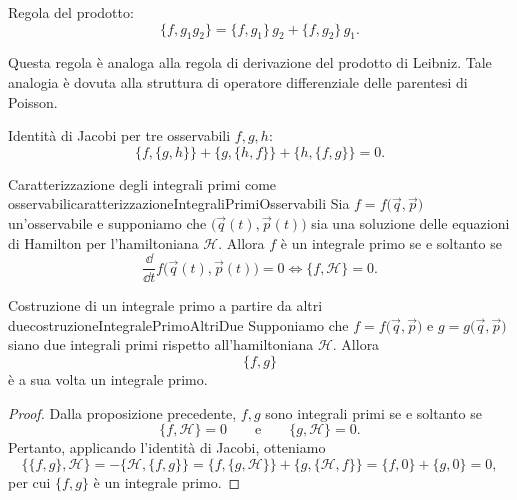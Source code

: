 \begin{pr}
	Regola del prodotto:
	\[
		\{f,g_1 g_2\} = \{f,g_1\}\,g_2 + \{f,g_2\}\,g_1.
	\]
\end{pr}

\begin{oss}
	Questa regola è analoga alla regola di derivazione del prodotto di Leibniz. Tale analogia è dovuta alla struttura di operatore differenziale delle parentesi di Poisson.
\end{oss}

\begin{pr}
	Identità di Jacobi per tre osservabili \(f,g,h\):
	\[
		\big\{f,\{g,h\}\big\} + \big\{g,\{h,f\}\big\} + \big\{h,\{f,g\}\big\} = 0.
	\]
\end{pr}

\begin{prop}{Caratterizzazione degli integrali primi come osservabili}{caratterizzazioneIntegraliPrimiOsservabili}
	Sia \(f=f\big(\vec{q},\vec{p}\big)\) un'osservabile e supponiamo che \(\big(\vec{q}(t),\vec{p}(t)\big)\) sia una soluzione delle equazioni di Hamilton per l'hamiltoniana \(\mathcal{H}\). Allora \(f\) è un integrale primo se e soltanto se
	\[
		\frac{\dd}{\dd t}f\big(\vec{q}(t),\vec{p}(t)\big) = 0 \iff \{f,\mathcal{H}\} = 0.
	\]
\end{prop}

\begin{prop}{Costruzione di un integrale primo a partire da altri due}{costruzioneIntegralePrimoAltriDue}
	Supponiamo che \(f=f\big(\vec{q},\vec{p}\big)\) e \(g=g\big(\vec{q},\vec{p}\big)\) siano due integrali primi rispetto all'hamiltoniana \(\mathcal{H}\). Allora
	\[
		\{f,g\}
	\]
	è a sua volta un integrale primo.
\end{prop}

\begin{proof}
	Dalla proposizione precedente, \(f,g\) sono integrali primi se e soltanto se
	\[
		\{f,\mathcal{H}\} = 0 \qquad\text{e}\qquad \{g,\mathcal{H}\} = 0.
	\]
	Pertanto, applicando l'identità di Jacobi, otteniamo
	\[
		\big\{\{f,g\},\mathcal{H}\big\} = -\big\{\mathcal{H},\{f,g\}\big\} = \big\{f,\{g,\mathcal{H}\}\big\} + \big\{g,\{\mathcal{H},f\}\big\} = \{f,0\} + \{g,0\} = 0,
	\]
	per cui \(\{f,g\}\) è un integrale primo.
\end{proof}
